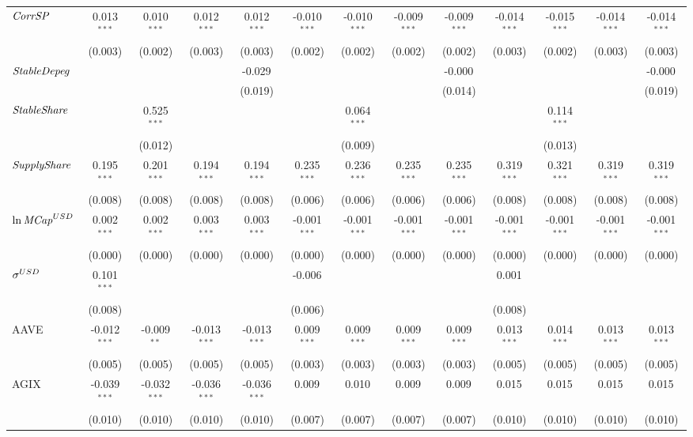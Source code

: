 \begin{table}[!htbp]
\begin{tabular}{@{\extracolsep{5pt}}lcccccccccccc}
 ${\it CorrSP}$ & 0.013$^{***}$ & 0.010$^{***}$ & 0.012$^{***}$ & 0.012$^{***}$ & -0.010$^{***}$ & -0.010$^{***}$ & -0.009$^{***}$ & -0.009$^{***}$ & -0.014$^{***}$ & -0.015$^{***}$ & -0.014$^{***}$ & -0.014$^{***}$ \\
  & (0.003) & (0.002) & (0.003) & (0.003) & (0.002) & (0.002) & (0.002) & (0.002) & (0.003) & (0.002) & (0.003) & (0.003) \\
 ${\it StableDepeg}$ & & & & -0.029$^{}$ & & & & -0.000$^{}$ & & & & -0.000$^{}$ \\
  & & & & (0.019) & & & & (0.014) & & & & (0.019) \\
 ${\it StableShare}$ & & 0.525$^{***}$ & & & & 0.064$^{***}$ & & & & 0.114$^{***}$ & & \\
  & & (0.012) & & & & (0.009) & & & & (0.013) & & \\
 ${\it SupplyShare}$ & 0.195$^{***}$ & 0.201$^{***}$ & 0.194$^{***}$ & 0.194$^{***}$ & 0.235$^{***}$ & 0.236$^{***}$ & 0.235$^{***}$ & 0.235$^{***}$ & 0.319$^{***}$ & 0.321$^{***}$ & 0.319$^{***}$ & 0.319$^{***}$ \\
  & (0.008) & (0.008) & (0.008) & (0.008) & (0.006) & (0.006) & (0.006) & (0.006) & (0.008) & (0.008) & (0.008) & (0.008) \\
 ${\it \ln MCap}^{USD}$ & 0.002$^{***}$ & 0.002$^{***}$ & 0.003$^{***}$ & 0.003$^{***}$ & -0.001$^{***}$ & -0.001$^{***}$ & -0.001$^{***}$ & -0.001$^{***}$ & -0.001$^{***}$ & -0.001$^{***}$ & -0.001$^{***}$ & -0.001$^{***}$ \\
  & (0.000) & (0.000) & (0.000) & (0.000) & (0.000) & (0.000) & (0.000) & (0.000) & (0.000) & (0.000) & (0.000) & (0.000) \\
 ${\it \sigma}^{USD}$ & 0.101$^{***}$ & & & & -0.006$^{}$ & & & & 0.001$^{}$ & & & \\
  & (0.008) & & & & (0.006) & & & & (0.008) & & & \\
 AAVE & -0.012$^{***}$ & -0.009$^{**}$ & -0.013$^{***}$ & -0.013$^{***}$ & 0.009$^{***}$ & 0.009$^{***}$ & 0.009$^{***}$ & 0.009$^{***}$ & 0.013$^{***}$ & 0.014$^{***}$ & 0.013$^{***}$ & 0.013$^{***}$ \\
  & (0.005) & (0.005) & (0.005) & (0.005) & (0.003) & (0.003) & (0.003) & (0.003) & (0.005) & (0.005) & (0.005) & (0.005) \\
 AGIX & -0.039$^{***}$ & -0.032$^{***}$ & -0.036$^{***}$ & -0.036$^{***}$ & 0.009$^{}$ & 0.010$^{}$ & 0.009$^{}$ & 0.009$^{}$ & 0.015$^{}$ & 0.015$^{}$ & 0.015$^{}$ & 0.015$^{}$ \\
  & (0.010) & (0.010) & (0.010) & (0.010) & (0.007) & (0.007) & (0.007) & (0.007) & (0.010) & (0.010) & (0.010) & (0.010) \\

\end{tabular}
\end{table}
